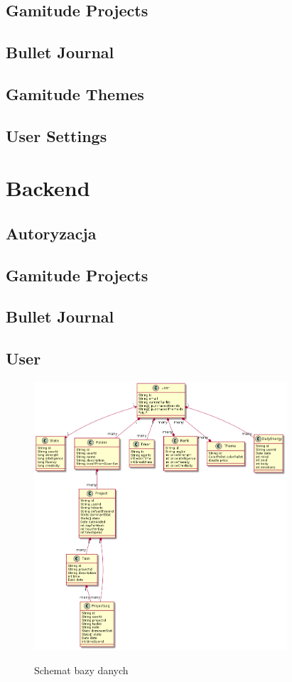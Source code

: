 \documentclass[a4paper,11pt]{report}
\begin{document}
\subsection{Gamitude Projects}
\subsection{Bullet Journal}
\subsection{Gamitude Themes}
\subsection{User Settings}
\section{Backend}
\subsection{Autoryzacja}
\subsection{Gamitude Projects}
\subsection{Bullet Journal}
\subsection{User}


\begin{figure}[h]
	\centering
	\includegraphics[width=\textwidth, height=10cm]{gamitude_database_model}\\
	\caption{Schemat bazy danych}
	\label{fig:db}
\end{figure}
\end{document}

